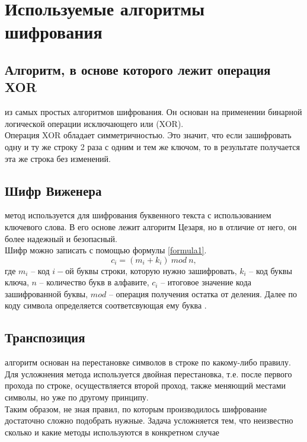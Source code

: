 \section{Используемые алгоритмы шифрования}

\subsection{Алгоритм, в основе которого лежит операция XOR}
 из самых простых алгоритмов шифрования. Он основан на применении бинарной логической операции исключающего или (XOR). \\

Операция XOR обладает симметричностью. Это значит, что если зашифровать одну и ту же строку 2 раза с одним и тем же ключом, то в результате получается эта же строка без изменений.

\subsection{Шифр Виженера}
 метод используется для шифрования буквенного текста с использованием ключевого слова. В его основе лежит алгоритм Цезаря, но в отличие от него, он более надежный и безопасный. \\

Шифр можно записать с помощью формулы \ref{formula1}.
\begin{equation}\label{formula1}
	c_i = (m_i + k_i)\:mod\:n,
\end{equation}
где $m_i$ -- код $i-$ой буквы строки, которую нужно зашифровать, $k_i$ -- код буквы ключа, $n$ -- количество букв в алфавите, $c_i$ -- итоговое значение кода зашифрованной буквы, $mod$ -- операция получения остатка от деления. Далее по коду символа определяется соответсвующая ему буква \cite{cript}.

\subsection{Транспозиция}
 алгоритм основан на перестановке символов в строке по какому-либо правилу. Для усложнения метода используется двойная перестановка, т.е. после первого прохода по строке, осуществляется второй проход, также меняющий местами символы, но уже по другому принципу.\\

Таким образом, не зная правил, по которым производилось шифрование достаточно сложно подобрать нужные. Задача усложняется тем, что неизвестно сколько и какие методы используются в конкретном случае \cite{cript2}

